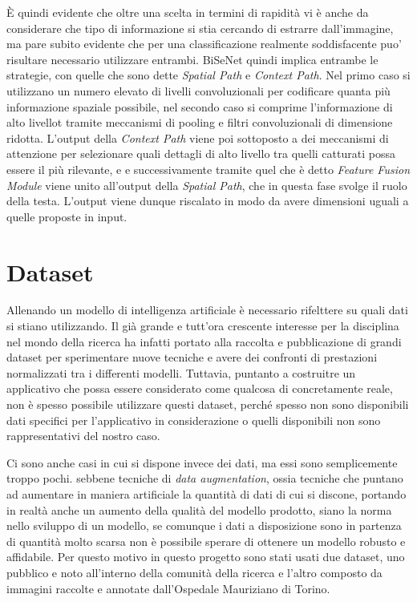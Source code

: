 È quindi evidente che oltre una scelta in termini di rapidità
vi è anche da considerare che tipo di informazione si stia cercando
di estrarre dall'immagine, ma pare subito evidente che per una
classificazione realmente soddisfacente puo' risultare necessario
utilizzare entrambi.
BiSeNet quindi implica entrambe le strategie, con quelle che sono
dette {\it Spatial Path} e {\it Context Path}.
Nel primo caso si utilizzano un numero elevato di livelli
convoluzionali per codificare quanta più informazione spaziale possibile,
nel secondo caso si comprime l'informazione di alto livellot tramite
meccanismi di pooling e filtri convoluzionali di dimensione ridotta.
L'output della {\it Context Path} viene poi sottoposto a dei
meccanismi di attenzione per selezionare quali dettagli di alto
livello tra quelli catturati possa essere il più rilevante, e
e successivamente tramite quel che è detto {\it Feature Fusion
Module} viene unito all'output della {\it Spatial Path}, che
in questa fase svolge il ruolo della testa.
L'output viene dunque riscalato in modo da avere dimensioni
uguali a quelle proposte in input.

\section{\label{sec:Dataset}Dataset}

Allenando un modello di intelligenza artificiale è necessario
rifelttere su quali dati si stiano utilizzando.
Il già grande e tutt'ora crescente interesse per la disciplina
nel mondo della ricerca ha infatti portato alla raccolta
e pubblicazione di grandi dataset per sperimentare
nuove tecniche e avere dei confronti di prestazioni
normalizzati tra i differenti modelli.
Tuttavia, puntanto a costruitre un applicativo che possa essere
considerato come qualcosa di concretamente reale, non è
spesso possibile utilizzare questi dataset, perché
spesso non sono disponibili dati specifici per l'applicativo
in considerazione o quelli disponibili non sono rappresentativi
del nostro caso.

Ci sono anche casi in cui si dispone invece dei dati, ma
essi sono semplicemente troppo pochi.
sebbene tecniche di {\it data augmentation}, ossia tecniche
che puntano ad aumentare in maniera artificiale la quantità
di dati di cui si discone, portando in realtà anche un
aumento della qualità del modello prodotto, siano la norma
nello sviluppo di un modello, se comunque i dati a disposizione
sono in partenza di quantità molto scarsa non è possibile
sperare di ottenere un modello robusto e affidabile.
Per questo motivo in questo progetto sono stati usati due
dataset, uno pubblico e noto all'interno della comunità
della ricerca e l'altro composto da immagini raccolte e
annotate dall'Ospedale Mauriziano di Torino.

